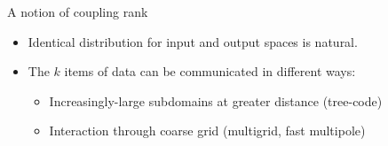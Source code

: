 \documentclass[final,t]{beamer}
\begin{document}
\begin{frame}{}
\begin{columns}
\begin{column}{0.31\textwidth}
\begin{block}{A notion of coupling rank}
\begin{figure}
        \end{figure}
        \begin{itemize}
        \item Identical distribution for input and output spaces is natural.
        \item The $k$ items of data can be communicated in different ways:
          \begin{itemize}
          \item Increasingly-large subdomains at greater distance (tree-code)
          \item Interaction through coarse grid (multigrid, fast multipole)
          \end{itemize}
        \end{itemize}
      \end{block}


\end{column}
\end{columns}
\end{frame}
\end{document}
